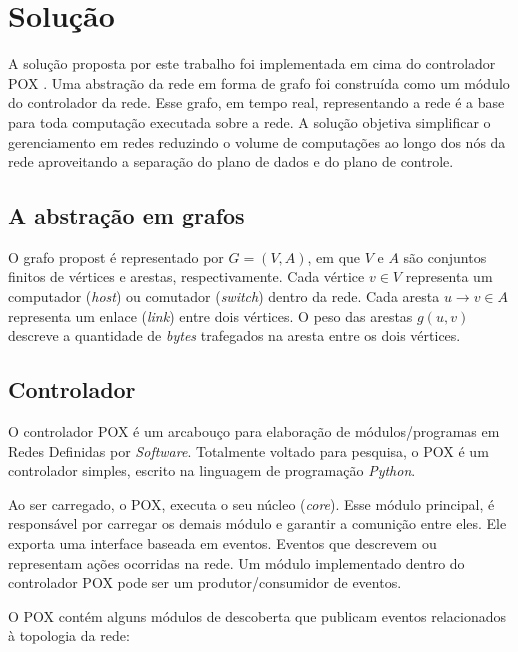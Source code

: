 \chapter{Solução}

A solução proposta por este trabalho foi implementada em cima do controlador
POX \citep{pox2015}. 
Uma abstração da rede em forma de grafo foi construída como um módulo 
do controlador da rede.
Esse grafo, em tempo real, representando a rede é a base para toda computação
executada sobre a rede.
A solução objetiva simplificar o gerenciamento em redes reduzindo o volume 
de computações ao longo dos nós da rede aproveitando a separação do plano 
de dados e do plano de controle.

\section{A abstração em grafos}

O grafo propost é representado por $G=(V, A)$, em que $V$ e $A$ são conjuntos
finitos de vértices e arestas, respectivamente.
Cada vértice $v \in V$ representa um computador (\emph{host}) ou comutador
(\emph{switch}) dentro da rede.
Cada aresta $u \to v \in A$ representa um enlace (\emph{link}) entre dois
vértices.
O peso das arestas $g(u, v)$ descreve a quantidade de \emph{bytes} trafegados
na aresta entre os dois vértices.

\section{Controlador}
\label{sec:controller}

O controlador POX é um arcabouço para elaboração de módulos/programas 
em Redes Definidas por \emph{Software}.
Totalmente voltado para pesquisa, o POX é um controlador simples, 
escrito na linguagem de programação \emph{Python}.

Ao ser carregado, o POX, executa o seu núcleo (\emph{core}). 
Esse módulo principal, é responsável por carregar os demais 
módulo e garantir a comunição entre eles.
Ele exporta uma interface baseada em eventos. 
Eventos que descrevem ou representam ações ocorridas na rede.
Um módulo implementado dentro do controlador POX pode ser um 
produtor/consumidor de eventos.

O POX contém alguns módulos de descoberta que publicam eventos relacionados
à topologia da rede:

